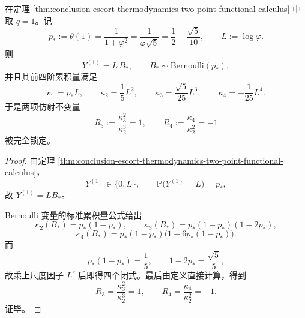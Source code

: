 \begin{corollary}[物理温度 \texorpdfstring{$q=1$}{q=1} 的黄金 Bernoulli 累积律]\label{cor:conclusion-physical-temperature-golden-bernoulli-cumulant-law}
在定理 \ref{thm:conclusion-escort-thermodynamics-two-point-functional-calculus} 中取 \(q=1\)。记
\[
p_*:=\theta(1)=\frac{1}{1+\varphi^2}=\frac{1}{\varphi\sqrt5}
=\frac12-\frac{\sqrt5}{10},
\qquad
L:=\log\varphi.
\]
则
\[
Y^{(1)}=L\,B_*,
\qquad
B_*\sim \mathrm{Bernoulli}(p_*),
\]
并且其前四阶累积量满足
\[
\kappa_1=p_*L,
\qquad
\kappa_2=\frac15L^2,
\qquad
\kappa_3=\frac{\sqrt5}{25}L^3,
\qquad
\kappa_4=-\frac1{25}L^4.
\]
于是两项仿射不变量
\[
R_3:=\frac{\kappa_3^2}{\kappa_2^3}=1,
\qquad
R_4:=\frac{\kappa_4}{\kappa_2^2}=-1
\]
被完全锁定。
\end{corollary}
\begin{proof}
由定理 \ref{thm:conclusion-escort-thermodynamics-two-point-functional-calculus}，
\[
Y^{(1)}\in\{0,L\},
\qquad
\mathbb P\!\bigl(Y^{(1)}=L\bigr)=p_*,
\]
故 \(Y^{(1)}=LB_*\)。

Bernoulli 变量的标准累积量公式给出
\[
\kappa_2(B_*)=p_*(1-p_*),
\qquad
\kappa_3(B_*)=p_*(1-p_*)(1-2p_*),
\]
\[
\kappa_4(B_*)=p_*(1-p_*)\bigl(1-6p_*(1-p_*)\bigr).
\]
而
\[
p_*(1-p_*)=\frac15,
\qquad
1-2p_*=\frac{\sqrt5}{5},
\]
故乘上尺度因子 \(L^r\) 后即得四个闭式。最后由定义直接计算，得到
\[
R_3=\frac{\kappa_3^2}{\kappa_2^3}=1,
\qquad
R_4=\frac{\kappa_4}{\kappa_2^2}=-1.
\]
证毕。
\end{proof}

